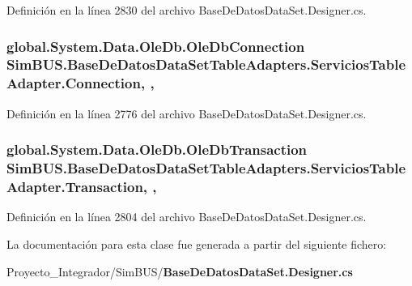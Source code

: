 Definición en la línea 2830 del archivo Base\-De\-Datos\-Data\-Set.\-Designer.\-cs.

\subsubsection[{Connection}]{\setlength{\rightskip}{0pt plus 5cm}global.\-System.\-Data.\-Ole\-Db.\-Ole\-Db\-Connection Sim\-B\-U\-S.\-Base\-De\-Datos\-Data\-Set\-Table\-Adapters.\-Servicios\-Table\-Adapter.\-Connection\hspace{0.3cm}{\ttfamily [get]}, {\ttfamily [set]}, {\ttfamily [package]}}\label{class_sim_b_u_s_1_1_base_de_datos_data_set_table_adapters_1_1_servicios_table_adapter_aae368ed7276faee10bb7a798dc9a5d3e}


Definición en la línea 2776 del archivo Base\-De\-Datos\-Data\-Set.\-Designer.\-cs.

\subsubsection[{Transaction}]{\setlength{\rightskip}{0pt plus 5cm}global.\-System.\-Data.\-Ole\-Db.\-Ole\-Db\-Transaction Sim\-B\-U\-S.\-Base\-De\-Datos\-Data\-Set\-Table\-Adapters.\-Servicios\-Table\-Adapter.\-Transaction\hspace{0.3cm}{\ttfamily [get]}, {\ttfamily [set]}, {\ttfamily [package]}}\label{class_sim_b_u_s_1_1_base_de_datos_data_set_table_adapters_1_1_servicios_table_adapter_a472e5e35d4f63b70ec29561cd0922fdd}


Definición en la línea 2804 del archivo Base\-De\-Datos\-Data\-Set.\-Designer.\-cs.



La documentación para esta clase fue generada a partir del siguiente fichero\-:\begin{DoxyCompactItemize}
\item 
Proyecto\-\_\-\-Integrador/\-Sim\-B\-U\-S/{\bf Base\-De\-Datos\-Data\-Set.\-Designer.\-cs}\end{DoxyCompactItemize}
